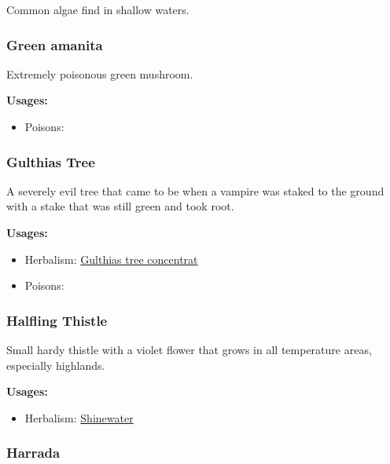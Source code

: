 Common algae find in shallow waters.

\subsubsection{Green amanita}
\label{Green amanita}

Extremely poisonous green mushroom.

\vspace{5mm}

\textbf{Usages:}

\begin{itemize}[noitemsep]
\item[] Poisons: \poison\poison
\end{itemize}

\subsubsection{Gulthias Tree}
\label{Gulthias Tree}

A severely evil tree that came to be when a vampire was staked to the ground with a stake that was still green and took root.

\vspace{5mm}

\textbf{Usages:}

\begin{itemize}[noitemsep]
\item[] Herbalism: \hyperref[Gulthias tree concentrat]{Gulthias tree concentrat}
\item[] Poisons: \poison\poison
\end{itemize}

\subsubsection{Halfling Thistle}
\label{Halfling Thistle}

Small hardy thistle with a violet flower that grows in all temperature areas, especially highlands.

\vspace{5mm}

\textbf{Usages:}

\begin{itemize}[noitemsep]
\item[] Herbalism: \hyperref[Shinewater]{Shinewater}
\end{itemize}

\subsubsection{Harrada}
\label{Harrada}

